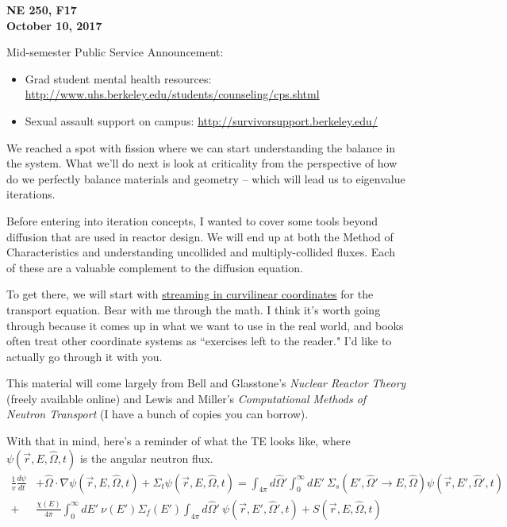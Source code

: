 \documentclass[12pt]{article}
\newcommand{\vOmega}{\ensuremath{\hat{\Omega}}}
\begin{document}
\begin{center}
{\bf NE 250, F17\\
October 10, 2017 
}
\end{center}

Mid-semester Public Service Announcement: 
\begin{itemize}
\item Grad student mental health resources: \url{http://www.uhs.berkeley.edu/students/counseling/cps.shtml}
\item Sexual assault support on campus: \url{http://survivorsupport.berkeley.edu/}
\end{itemize}

We reached a spot with fission where we can start understanding the balance in the system. What we'll do next is look at criticality from the perspective of how do we perfectly balance materials and geometry -- which will lead us to eigenvalue iterations. 

Before entering into iteration concepts, I wanted to cover some tools beyond diffusion that are used in reactor design. We will end up at both the Method of Characteristics and understanding uncollided and multiply-collided fluxes. Each of these are a valuable complement to the diffusion equation. 

To get there, we will start with \underline{streaming in curvilinear coordinates} for the transport equation. Bear with me through the math. I think it's worth going through because it comes up in what we want to use in the real world, and books often treat other coordinate systems as ``exercises left to the reader." I'd like to actually go through it with you.

This material will come largely from Bell and Glasstone's \textit{Nuclear Reactor Theory} (freely available online) and Lewis and Miller's \textit{Computational Methods of Neutron Transport} (I have a bunch of copies you can borrow). 

With that in mind, here's a reminder of what the TE looks like, where $\psi(\vec{r}, E, \vOmega, t)$ is the angular neutron flux. 
%
\begin{align*}
\frac{1}{v} \frac{d \psi}{dt} &+ \vOmega \cdot \nabla \psi(\vec{r}, E, \vOmega, t) + \Sigma_t \psi(\vec{r}, E, \vOmega, t) = \int_{4 \pi} d\vOmega' \int_0^{\infty} dE' \: \Sigma_s(E', \vOmega' \rightarrow E, \vOmega) \psi(\vec{r}, E', \vOmega', t)\\
 +& \frac{\chi(E)}{4 \pi}\int_0^{\infty} dE' \: \nu(E') \Sigma_f(E') \int_{4 \pi} d\vOmega' \:\psi(\vec{r}, E', \vOmega', t) + S(\vec{r}, E, \vOmega, t)
\end{align*}
\end{document}
